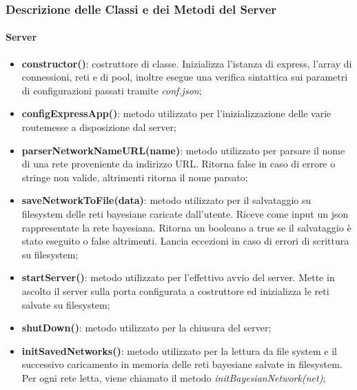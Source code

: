 \subsubsection{Descrizione delle Classi e dei Metodi del Server}\label{descrizionearchServer}

\paragraph{Server}

\begin{itemize}

	\item \textbf{constructor()}: costruttore di classe. Inizializza l'istanza di express\glossario , l'array di
	 connessioni, reti e di pool, inoltre esegue una verifica sintattica sui parametri di configurazioni passati 
	 tramite \textit{conf.json};

	 \item \textbf{configExpressApp()}: metodo utilizzato per l'inizializzazione delle varie route\glossario messe 
	 a disposizione dal server;

	 \item \textbf{parserNetworkNameURL(name)}: metodo utilizzato per parsare il nome di una rete 	
	 proveniente da indirizzo URL. 
	 Ritorna false in caso di errore o stringe non valide, altrimenti ritorna il nome parsato;

	 \item \textbf{saveNetworkToFile(data)}: metodo utilizzato per il salvataggio su filesystem delle reti 
	 bayesiane caricate dall'utente. Riceve come input un json rappresentate la rete bayesiana. Ritorna un 	
	 booleano a true se il salvataggio è stato eseguito o false altrimenti. Lancia eccezioni in caso di errori di 
	 scrittura su filesystem;

	 \item \textbf{startServer()}: metodo utilizzato per l'effettivo avvio del server. Mette in ascolto il server 
	 sulla porta configurata a costruttore ed inizializza le reti salvate su filesystem; 

	 \item \textbf{shutDown()}: metodo utilizzato per la chiusura del server; 

	 \item \textbf{initSavedNetworks()}: metodo utilizzato per  la lettura da file system e il successivo
	 caricamento in memoria  delle reti bayesiane salvate in filesystem. Per ogni rete letta, viene chiamato
	 il metodo \textit{initBayesianNetwork(net)};


\end{itemize}
